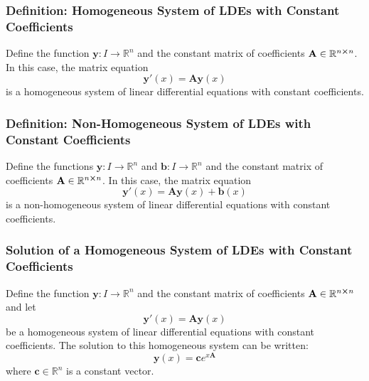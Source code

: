 \documentclass[11pt, a4paper]{article}
\newcommand{\R}{\mathbb{R}} %
\begin{document}
\subsubsection{Definition: Homogeneous System of LDEs with Constant Coefficients}
Define the function $ \bm{y}: I \to \R^n $ and the constant matrix of coefficients $ \mathbf{A} \in \R^{n \cross n}$. In this case, the matrix equation
\begin{equation*}
	\bm{y}'(x) = \mathbf{A} \bm{y}(x)
\end{equation*}
is a homogeneous system of linear differential equations with constant coefficients.

\subsubsection{Definition: Non-Homogeneous System of LDEs with Constant Coefficients}
Define the functions $ \bm{y}: I \to \R^n $ and $ \bm{b}:  I \to \R^n $ and the constant matrix of coefficients $ \mathbf{A} \in \R^{n \cross n}$. In this case, the matrix equation
\begin{equation*}
	\bm{y}'(x) = \mathbf{A} \bm{y}(x) + \bm{b}(x)
\end{equation*}
is a non-homogeneous system of linear differential equations with constant coefficients.

\subsubsection{Solution of a Homogeneous System of LDEs with Constant Coefficients}
Define the function $ \bm{y}: I \to \R^n $ and the constant matrix of coefficients $ \mathbf{A} \in \R^{n \cross n}$ and let
\begin{equation*}
	\bm{y}'(x) = \mathbf{A} \bm{y}(x)
\end{equation*}
be a homogeneous system of linear differential equations with constant coefficients. The solution to this homogeneous system can be written:
\begin{equation*}
	\bm{y}(x) = \bm{c} e^{x \mathbf{A}}
\end{equation*}
where $ \bm{c} \in \R^n $ is a constant vector.

\end{document}
